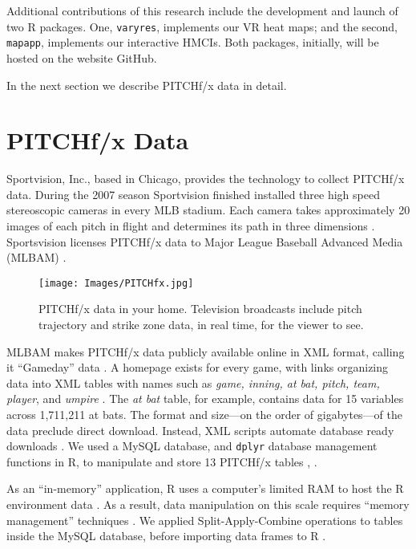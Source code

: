 Additional contributions of this research include the development and launch of two R packages. One, \verb|varyres|, implements our VR heat maps; and the second, \verb|mapapp|, implements our interactive HMCIs. Both packages, initially, will be hosted on the website GitHub.

In the next section we describe PITCHf/x\textsuperscript{\textregistered} data in detail.

\section{PITCHf/x\textsuperscript{\textregistered} Data} %
Sportvision, Inc., based in Chicago, provides the technology to collect PITCHf/x\textsuperscript{\textregistered} data. During the 2007 season Sportvision finished installed three high speed stereoscopic cameras in every MLB\textsuperscript{\textregistered} stadium. Each camera takes approximately 20 images of each pitch in flight and determines its path in three dimensions \citep{Fast2010}. Sportsvision licenses PITCHf/x\textsuperscript{\textregistered} data to Major League Baseball Advanced Media (MLBAM\textsuperscript{\textregistered}) \citep{Baumer2010}. 

        \begin{figure}[H]
      	\centering
      	\texttt{[image: Images/PITCHfx.jpg]} 
      	\caption{PITCHf/x\textsuperscript{\textregistered} data in your home. Television broadcasts include pitch trajectory and strike zone data, in real time, for the viewer to see.}
      	\label{fig:fx1}
      	\end{figure} 
MLBAM\textsuperscript{\textregistered} makes PITCHf/x\textsuperscript{\textregistered} data publicly available online in XML format, calling it ``Gameday'' data \citep{Sievert2014}. A homepage exists for every game, with links organizing data into XML tables with names such as {\it game, inning, at bat, pitch, team, player}, and {\it umpire} \citep{Sievert2014}. The {\it at bat} table, for example, contains data for 15 variables across 1,711,211 at bats. The format and size---on the order of gigabytes---of the data preclude direct download. Instead, XML scripts automate database ready downloads \citep{Adler2006}. We used a MySQL database, and \verb|dplyr| database management functions in R, to manipulate and store 13 PITCHf/x\textsuperscript{\textregistered} tables \citep{Tahaghoghi2006}, \citep{Wickham2016}. 

As an ``in-memory'' application, R uses a computer's limited RAM to host the R environment data \citep{Smith2013}. As a result, data manipulation on this scale requires ``memory management'' techniques \citep{Wickham2014}.  We applied Split-Apply-Combine operations to tables inside the MySQL database, before importing data frames to R \citep{Wickham2011}.


